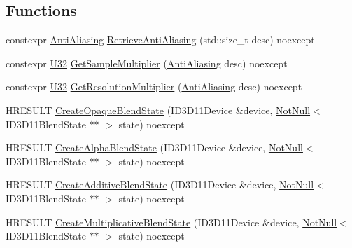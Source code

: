 \subsection*{Functions}
\begin{DoxyCompactItemize}
\item 
constexpr \mbox{\hyperlink{namespacemage_1_1rendering_ac3f75e49e92b42f2f5fb55c450d8899c}{Anti\+Aliasing}} \mbox{\hyperlink{namespacemage_1_1rendering_a0e95130a488225f0525578cc6943a260}{Retrieve\+Anti\+Aliasing}} (std\+::size\+\_\+t desc) noexcept
\item 
constexpr \mbox{\hyperlink{namespacemage_aa5d6eaabaac3cdd01873d6a3d27e90f3}{U32}} \mbox{\hyperlink{namespacemage_1_1rendering_a8974628b18f5bb28f8f7c570998872d5}{Get\+Sample\+Multiplier}} (\mbox{\hyperlink{namespacemage_1_1rendering_ac3f75e49e92b42f2f5fb55c450d8899c}{Anti\+Aliasing}} desc) noexcept
\item 
constexpr \mbox{\hyperlink{namespacemage_aa5d6eaabaac3cdd01873d6a3d27e90f3}{U32}} \mbox{\hyperlink{namespacemage_1_1rendering_a9b87b3d2d6f992fe51f3bfc52cdb6e72}{Get\+Resolution\+Multiplier}} (\mbox{\hyperlink{namespacemage_1_1rendering_ac3f75e49e92b42f2f5fb55c450d8899c}{Anti\+Aliasing}} desc) noexcept
\item 
H\+R\+E\+S\+U\+LT \mbox{\hyperlink{namespacemage_1_1rendering_a217f724bf8c158f8d77e55a865832dd6}{Create\+Opaque\+Blend\+State}} (I\+D3\+D11\+Device \&device, \mbox{\hyperlink{namespacemage_a8769f9d670d6b585ea306cb1062af94b}{Not\+Null}}$<$ I\+D3\+D11\+Blend\+State $\ast$$\ast$ $>$ state) noexcept
\item 
H\+R\+E\+S\+U\+LT \mbox{\hyperlink{namespacemage_1_1rendering_a142afbabb4446fd8e5ebedbcc999ad47}{Create\+Alpha\+Blend\+State}} (I\+D3\+D11\+Device \&device, \mbox{\hyperlink{namespacemage_a8769f9d670d6b585ea306cb1062af94b}{Not\+Null}}$<$ I\+D3\+D11\+Blend\+State $\ast$$\ast$ $>$ state) noexcept
\item 
H\+R\+E\+S\+U\+LT \mbox{\hyperlink{namespacemage_1_1rendering_a224f4925f5da208c4ff3108884beb1d1}{Create\+Additive\+Blend\+State}} (I\+D3\+D11\+Device \&device, \mbox{\hyperlink{namespacemage_a8769f9d670d6b585ea306cb1062af94b}{Not\+Null}}$<$ I\+D3\+D11\+Blend\+State $\ast$$\ast$ $>$ state) noexcept
\item 
H\+R\+E\+S\+U\+LT \mbox{\hyperlink{namespacemage_1_1rendering_a379bf058f263791fb489c5c4cbea35e8}{Create\+Multiplicative\+Blend\+State}} (I\+D3\+D11\+Device \&device, \mbox{\hyperlink{namespacemage_a8769f9d670d6b585ea306cb1062af94b}{Not\+Null}}$<$ I\+D3\+D11\+Blend\+State $\ast$$\ast$ $>$ state) noexcept

\end{DoxyCompactItemize}
